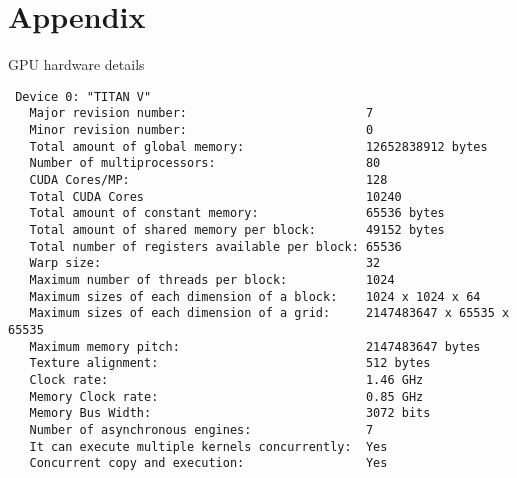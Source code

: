 
\section{Appendix}


\begin{listing}[H]
    \caption{GPU hardware details}%
    \label{lst:gpu_info}
 \begin{verbatim}
 Device 0: "TITAN V"
   Major revision number:                         7
   Minor revision number:                         0
   Total amount of global memory:                 12652838912 bytes
   Number of multiprocessors:                     80
   CUDA Cores/MP:                                 128
   Total CUDA Cores                               10240
   Total amount of constant memory:               65536 bytes
   Total amount of shared memory per block:       49152 bytes
   Total number of registers available per block: 65536
   Warp size:                                     32
   Maximum number of threads per block:           1024
   Maximum sizes of each dimension of a block:    1024 x 1024 x 64
   Maximum sizes of each dimension of a grid:     2147483647 x 65535 x 65535
   Maximum memory pitch:                          2147483647 bytes
   Texture alignment:                             512 bytes
   Clock rate:                                    1.46 GHz
   Memory Clock rate:                             0.85 GHz
   Memory Bus Width:                              3072 bits
   Number of asynchronous engines:                7
   It can execute multiple kernels concurrently:  Yes
   Concurrent copy and execution:                 Yes
 \end{verbatim}
\end{listing}
